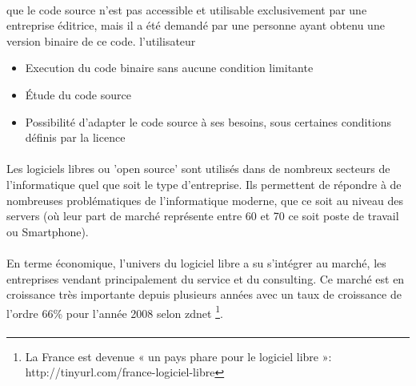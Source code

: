 \paragraph{} %
que le code source n'est pas accessible et utilisable exclusivement par
une entreprise éditrice, mais%
il a été demandé par une personne ayant obtenu une version
binaire de ce code. %
l'utilisateur %

\begin{itemize}

  \item {Execution du code binaire sans aucune condition limitante}

  \item {Étude du code source}

  \item {Possibilité d'adapter le code source à ses besoins, sous
  certaines
    conditions définis par la licence}

\end{itemize}

\paragraph {}

Les logiciels libres ou 'open source' sont utilisés dans de nombreux
secteurs de l'informatique quel que soit le type d'entreprise. Ils
permettent de répondre à de nombreuses problématiques de l'informatique
moderne, que ce soit au niveau des servers (où leur part de marché
représente entre 60 et 70%
ce soit poste de travail ou Smartphone).

\paragraph {}

En terme économique, l'univers du logiciel libre a su s'intégrer
au marché, les entreprises vendant principalement du service et du
consulting. Ce marché est en croissance très importante depuis plusieurs
années avec un taux de croissance de l'ordre 66\% pour l'année 2008
selon zdnet \footnote{La France est devenue « un pays phare pour le
logiciel libre »: http://tinyurl.com/france-logiciel-libre}.

\paragraph{}

